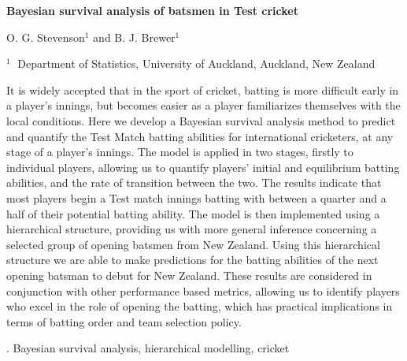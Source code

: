 \documentclass[12pt]{article}
\begin{document}



\begin{flushleft}


{\LARGE\bf Bayesian survival analysis of batsmen in Test cricket}


\vspace{1.0cm}

O. G. Stevenson$^1$ and B. J. Brewer$^1$

\begin{description}

\item $^1 \;$ Department of Statistics, University of Auckland,
Auckland, New Zealand

\end{description}

\end{flushleft}


\vspace{0.75cm}

It is widely accepted that in the sport of cricket, batting is more difficult
early in a player's innings, but becomes easier as a player familiarizes
themselves with the local conditions.
Here we develop a Bayesian survival analysis method to predict and quantify the
Test Match batting abilities for international cricketers, at any stage of
a player's innings.
The model is applied in two stages, firstly to individual players, allowing us
to quantify players' initial and equilibrium batting abilities, and the rate
of transition between the two.
The results indicate that most players begin a Test match innings batting with
between a quarter and a half of their potential batting ability.
The model is then implemented using a hierarchical structure, providing us with more
general inference concerning a selected group of opening batsmen from New Zealand.
Using this hierarchical structure we are able to make predictions for the batting
abilities of the next opening batsman to debut for New Zealand.
These results are considered in conjunction with other performance based
metrics, allowing us to identify players who excel in the role of opening the
batting, which has practical implications in terms of batting order and team selection policy.


\vskip 2mm

.
Bayesian survival analysis, hierarchical modelling, cricket
\end{document}
